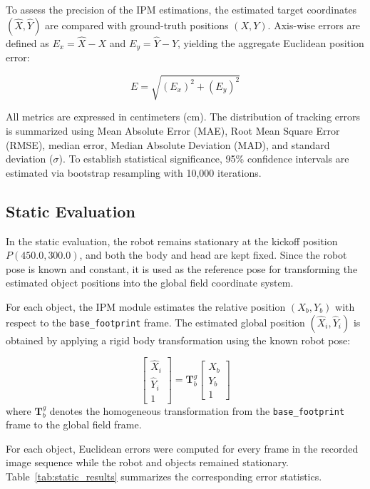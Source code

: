 \documentclass[journal]{IAENGtran}
\begin{document}
To assess the precision of the IPM estimations, the estimated target coordinates
$(\hat{X}, \hat{Y})$ are compared with ground-truth positions $(X, Y)$. Axis-wise errors
are defined as $E_x = \hat{X} - X$ and $E_y = \hat{Y} - Y$, yielding the aggregate
Euclidean position error:

\begin{equation}
E = \sqrt{(E_x )^2 + ( E_y )^2}
\end{equation}

All metrics are expressed in centimeters (cm). The distribution of tracking errors
is summarized using Mean Absolute Error (MAE), Root Mean Square Error (RMSE), median error,
Median Absolute Deviation (MAD), and standard deviation ($\sigma$). To establish
statistical significance, 95\% confidence intervals are estimated via bootstrap resampling
with 10,000 iterations.

\subsection{Static Evaluation}

In the static evaluation, the robot remains stationary at the kickoff
position $P(450.0, 300.0)$, and both the body and head are kept fixed.
Since the robot pose is known and constant, it is used as the reference
pose for transforming the estimated object positions into the global
field coordinate system.

For each object, the IPM module estimates the relative position
$(X_b, Y_b)$ with respect to the \texttt{base\_footprint} frame.
The estimated global position $(\hat{X}_i, \hat{Y}_i)$ is obtained
by applying a rigid body transformation using the known robot pose:

\begin{equation}
\begin{bmatrix}
\hat{X}_i \\
\hat{Y}_i \\
1
\end{bmatrix}
=
\mathbf{T}_{b}^{g}
\begin{bmatrix}
X_b \\
Y_b \\
1
\end{bmatrix}
\end{equation}
where $\mathbf{T}_{b}^{g}$ denotes the homogeneous transformation
from the \texttt{base\_footprint} frame to the global field frame.

For each object, Euclidean errors were computed for every frame in the
recorded image sequence while the robot and objects remained stationary.
Table~\ref{tab:static_results} summarizes the corresponding error statistics.
\end{document}

